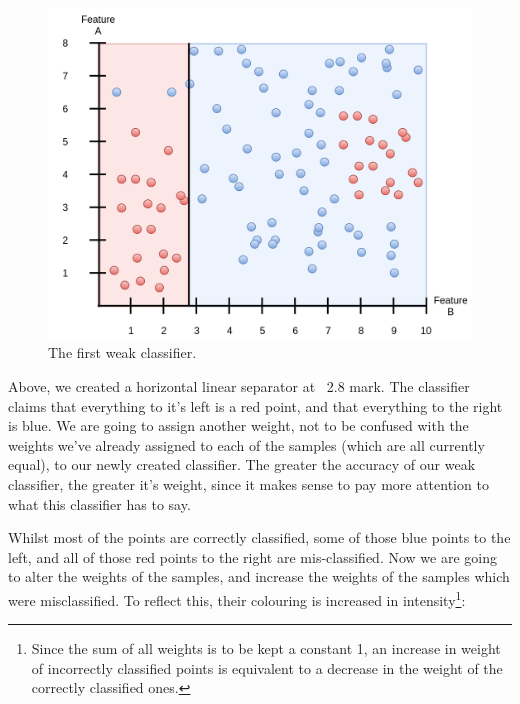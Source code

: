 \documentclass[a4paper, 12pt]{article}
\begin{document}
                    
                    \begin{figure}[h]
                            \caption{The first weak classifier.}
                            \centering
                            \includegraphics[width=\textwidth]{boosting1}
                    \end{figure} 
                    
                    \par Above, we created a horizontal linear separator at ~2.8 mark. The classifier claims that everything to it's left is a red point, and that everything to the right is blue. We are going to assign another weight, not to be confused with the weights we've already assigned to each of the samples (which are all currently equal), to our newly created classifier. The greater the accuracy of our weak classifier, the greater it's weight, since it makes sense to pay more attention to what this classifier has to say.
                    
                    \par Whilst most of the points are correctly classified, some of those blue points to the left, and all of those red points to the right are mis-classified. Now we are going to alter the weights of the samples, and increase the weights of the samples which were misclassified. To reflect this, their colouring is increased in intensity\footnote{Since the sum of all weights is to be kept a constant 1, an increase in weight of incorrectly classified points is equivalent to a decrease in the weight of the correctly classified ones.}:
                    
\end{document}
